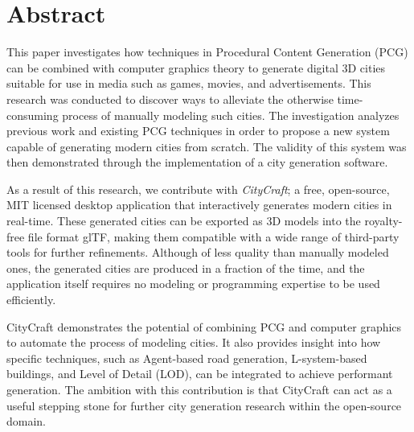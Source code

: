 \chapter*{Abstract}

This paper investigates how techniques in Procedural Content Generation (PCG) can be combined with computer graphics theory to generate digital 3D cities suitable for use in media such as games, movies, and advertisements.
This research was conducted to discover ways to alleviate the otherwise time-consuming process of manually modeling such cities.
The investigation analyzes previous work and existing PCG techniques in order to propose a new system capable of generating modern cities from scratch. 
The validity of this system was then demonstrated through the implementation of a city generation software.

As a result of this research, we contribute with \textit{CityCraft}; a free, open-source, MIT licensed desktop application that interactively generates modern cities in real-time.
These generated cities can be exported as 3D models into the royalty-free file format glTF, making them compatible with a wide range of third-party tools for further refinements.
Although of less quality than manually modeled ones, the generated cities are produced in a fraction of the time, and the application itself requires no modeling or programming expertise to be used efficiently.

CityCraft demonstrates the potential of combining PCG and computer graphics to automate the process of modeling cities.
It also provides insight into how specific techniques, such as Agent-based road generation, L-system-based buildings, and Level of Detail (LOD), can be integrated to achieve performant generation.
The ambition with this contribution is that CityCraft can act as a useful stepping stone for further city generation research within the open-source domain.